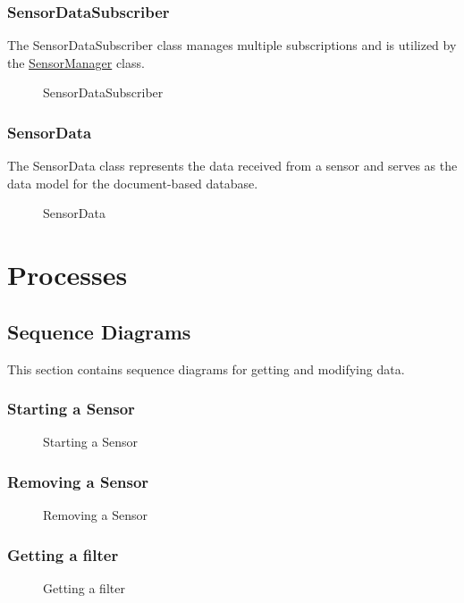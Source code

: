 \documentclass[12pt]{article}
\newcounter{fr}
\begin{document}
\subsubsection{SensorDataSubscriber}
\label{sec:SensorDataSubscriber}
The SensorDataSubscriber class manages multiple subscriptions and is utilized by the \hyperref[sec:CSensorManager]{SensorManager} class.
\begin{figure}[ht]
\centering

\caption{\label{fig:bild26} SensorDataSubscriber}
\end{figure}
\newpage
\subsubsection{SensorData}
\label{sec:SensorData}
The SensorData class represents the data received from a sensor and serves as the data model for the document-based database.
\begin{figure}[ht]
\centering

\caption{\label{fig:bild27} SensorData}
\end{figure}
\newpage

\section{Processes}
\label{sec:Processes}
\subsection{Sequence Diagrams}
This section contains sequence diagrams for getting and modifying data.

\subsubsection{Starting a Sensor}
\label{sec:StartingASensor}
\begin{figure}[ht]
\centering

\caption{\label{fig:bild28} Starting a Sensor}
\end{figure}

\newpage


\subsubsection{Removing a Sensor}
\label{sec:RemovingASensor}
\begin{figure}[ht]
\centering

\caption{\label{fig:bild29} Removing a Sensor}
\end{figure}


\subsubsection{Getting a filter}
\label{sec:GettingAFilter}
\begin{figure}[ht]
\centering

\caption{\label{fig:bild30} Getting a filter}
\end{figure}
\end{document}
